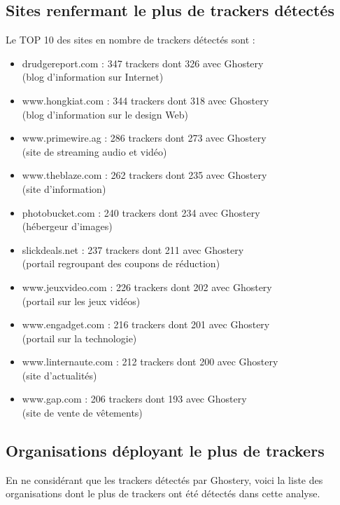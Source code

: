 \subsection{Sites renfermant le plus de trackers détectés}
Le TOP 10 des sites en nombre de trackers détectés sont :
\begin{itemize}
	\item drudgereport.com : 347 trackers dont 326 avec Ghostery\\(blog d'information sur Internet)
	\item www.hongkiat.com : 344 trackers dont 318 avec Ghostery\\(blog d'information sur le design Web)
	\item www.primewire.ag : 286 trackers dont 273 avec Ghostery\\(site de streaming audio et vidéo)
	\item www.theblaze.com : 262 trackers dont 235 avec Ghostery\\(site d'information)
	\item photobucket.com : 240 trackers dont 234 avec Ghostery\\(hébergeur d'images)
	\item slickdeals.net : 237 trackers dont 211 avec Ghostery\\(portail regroupant des coupons de réduction)
	\item www.jeuxvideo.com : 226 trackers dont 202 avec Ghostery\\(portail sur les jeux vidéos)
	\item www.engadget.com : 216 trackers dont 201 avec Ghostery\\(portail sur la technologie)
	\item www.linternaute.com : 212 trackers dont 200 avec Ghostery\\(site d'actualités)
	\item www.gap.com : 206 trackers dont 193 avec Ghostery\\(site de vente de vêtements)
	\newline
\end{itemize}

\subsection{Organisations déployant le plus de trackers}
En ne considérant que les trackers détectés par Ghostery, voici la liste des organisations dont le plus de trackers ont été détectés dans cette analyse.
\newline

